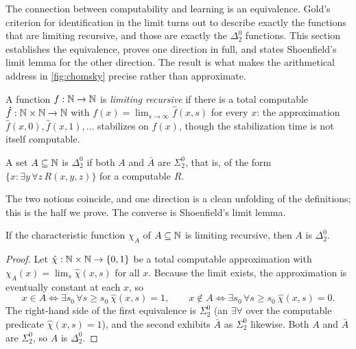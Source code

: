 The connection between computability and learning is an equivalence. Gold's criterion for identification in the limit turns out to describe exactly the functions that are limiting recursive, and those are exactly the $\Delta^0_2$ functions. This section establishes the equivalence, proves one direction in full, and states Shoenfield's limit lemma for the other direction. The result is what makes the arithmetical address in \cref{fig:chomsky} precise rather than approximate.

\begin{defn}
\label{def:limiting-recursion}
A function $f : \mathbb{N} \to \mathbb{N}$ is \emph{limiting recursive} if there is a total computable $\hat{f} : \mathbb{N} \times \mathbb{N} \to \mathbb{N}$ with $f(x) = \lim_{s \to \infty} \hat{f}(x, s)$ for every $x$: the approximation $\hat{f}(x,0), \hat{f}(x,1), \ldots$ stabilizes on $f(x)$, though the stabilization time is not itself computable.
\end{defn}

\begin{defn}
\label{def:delta-02}
A set $A \subseteq \mathbb{N}$ is \emph{$\Delta^0_2$} if both $A$ and $\bar{A}$ are $\Sigma^0_2$, that is, of the form $\{x : \exists y\, \forall z\, R(x,y,z)\}$ for a computable $R$.
\end{defn}

The two notions coincide, and one direction is a clean unfolding of the definitions; this is the half we prove. The converse is Shoenfield's limit lemma.

\begin{prop}
\label{prop:limit-delta}
If the characteristic function $\chi_A$ of $A \subseteq \mathbb{N}$ is limiting recursive, then $A$ is $\Delta^0_2$.
\end{prop}

\begin{proof}
Let $\hat{\chi} : \mathbb{N} \times \mathbb{N} \to \{0,1\}$ be a total computable approximation with $\chi_A(x) = \lim_s \hat{\chi}(x,s)$ for all $x$. Because the limit exists, the approximation is eventually constant at each $x$, so
\[
x \in A \iff \exists s_0\, \forall s \geq s_0\ \hat{\chi}(x,s) = 1, \qquad
x \notin A \iff \exists s_0\, \forall s \geq s_0\ \hat{\chi}(x,s) = 0 .
\]
The right-hand side of the first equivalence is $\Sigma^0_2$ (an $\exists\forall$ over the computable predicate $\hat{\chi}(x,s)=1$), and the second exhibits $\bar{A}$ as $\Sigma^0_2$ likewise. Both $A$ and $\bar A$ are $\Sigma^0_2$, so $A$ is $\Delta^0_2$.
\end{proof}

